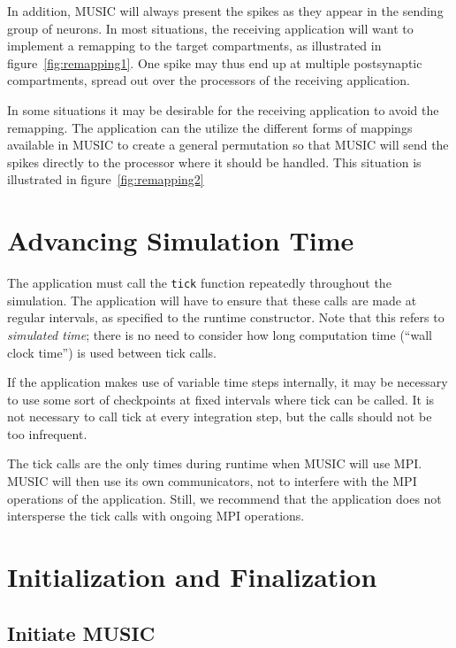 \documentclass[a4paper,twoside]{report}
\begin{document}
In addition, MUSIC will always present the spikes as they appear in
the sending group of neurons.  In most situations, the receiving
application will want to implement a remapping to the target
compartments, as illustrated in figure~\ref{fig:remapping1}.  One spike
may thus end up at multiple postsynaptic compartments, spread out over
the processors of the receiving application.

In some situations it may be desirable for the receiving application
to avoid the remapping.  The application can the utilize the different
forms of mappings available in MUSIC to create a general permutation
so that MUSIC will send the spikes directly to the processor where it
should be handled.  This situation is illustrated in
figure~\ref{fig:remapping2}


\section{Advancing Simulation Time}

The application must call the \lstinline|tick| function repeatedly
throughout the simulation.  The application will have to ensure that
these calls are made at regular intervals, as specified to the runtime
constructor.  Note that this refers to \emph{simulated time}; there is
no need to consider how long computation time (``wall clock time'') is
used between tick calls.

If the application makes use of variable time steps internally, it may
be necessary to use some sort of checkpoints at fixed intervals where
tick can be called.  It is not necessary to call tick at every
integration step, but the calls should not be too infrequent.

The tick calls are the only times during runtime when MUSIC will use
MPI.  MUSIC will then use its own communicators, not to interfere with
the MPI operations of the application.  Still, we recommend that the
application does not intersperse the tick calls with ongoing MPI
operations.


\section{Initialization and Finalization}

\subsection{Initiate MUSIC}
\end{document}
